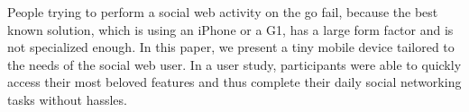 
People trying to perform a social web activity on the go fail, because the best known solution, which is using an iPhone or a G1, 
has a large form factor and is not specialized enough. In this paper, we present a tiny mobile device tailored to the needs of 
the social web user. In a user study, participants were able to quickly access their most beloved features and thus complete 
their daily social networking tasks without hassles.
